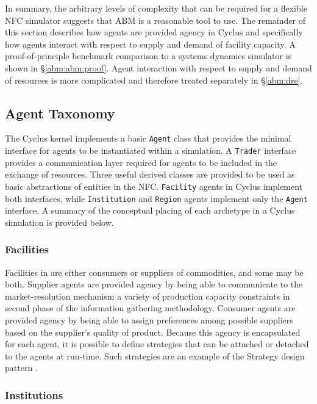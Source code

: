 In summary, the arbitrary levels of complexity that can be required for a
flexible NFC simulator suggests that ABM is a reasonable tool to use. The
remainder of this section describes how agents are provided agency in Cyclus and
specifically how agents interact with respect to supply and demand of facility
capacity. A proof-of-principle benchmark comparison to a systems dynamics
simulator is shown in \S \ref{abm:abm:proof}. Agent interaction with respect to
supply and demand of resources is more complicated and therefore treated
separately in \S \ref{abm:dre}.

\subsection{Agent Taxonomy}\label{abm:abm:tax}

The Cyclus kernel implements a basic \texttt{Agent} class that provides the
minimal interface for agents to be instantiated within a simulation. A
\texttt{Trader} interface provides a communication layer required for agents to be
included in the exchange of resources. Three useful derived classes are provided
to be used as basic abstractions of entities in the NFC. \texttt{Facility} agents
in Cyclus implement both interfaces, while \texttt{Institution} and \texttt{Region}
agents implement only the \texttt{Agent} interface.  A summary of the conceptual
placing of each archetype in a Cyclus simulation is provided below.

\subsubsection{Facilities}

Facilities in \Cyclus are either consumers or suppliers of commodities, and some
may be both. Supplier agents are provided agency by being able to communicate to
the market-resolution mechanism a variety of production capacity constraints in
second phase of the information gathering methodology. Consumer agents are
provided agency by being able to assign preferences among possible suppliers
based on the supplier's quality of product. Because this agency is encapsulated
for each agent, it is possible to define strategies that can be attached or
detached to the agents at run-time. Such strategies are an example of the
Strategy design pattern \cite{vlissides_design_1995}.

\subsubsection{Institutions}

